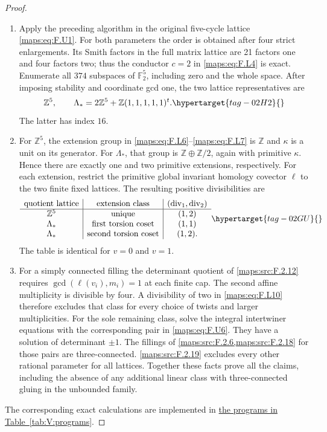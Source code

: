 \documentclass[11pt,a4paper]{article}
\numberwithin{equation}{section}
\theoremstyle{definition}
\begin{document}
\begin{proof}
\begin{enumerate}[label=\arabic*.]
\item Apply the preceding algorithm in the original five-cycle
lattice \eqref{maps:eq:F.U1}.  For both parameters the order is obtained
after four strict enlargements.  Its Smith factors in the
full matrix lattice are 21 factors one and four factors two;
thus the conductor $c=2$ in \eqref{maps:eq:F.L4} is exact.
Enumerate all $374$ subspaces of $\mathbb F_2^5$, including zero
and the whole space.
After imposing stability and coordinate gcd one, the two
lattice representatives are
\begin{equation}
 \mathbb Z^5,\qquad
 \Lambda_* =2\mathbb Z^5+\mathbb Z(1,1,1,1,1)^t.
 \hypertarget{tag-02H2}{}\label{maps:eq:F.L9}
\end{equation}
The latter has index $16$.

\item For $\mathbb Z^5$, the extension group in \eqref{maps:eq:F.L6}--\eqref{maps:eq:F.L7}
is $\mathbb Z$ and $\kappa$ is a unit on its generator.
For $\Lambda_*$, that group is
$\mathbb Z\oplus\mathbb Z/2$, again with primitive
$\kappa$.  Hence there are exactly one and two primitive
extensions, respectively.
For each extension, restrict the primitive global invariant homology
covector $\ell$ to the two finite fixed lattices. The resulting
positive divisibilities are
\begin{equation}
\begin{array}{c|c|c}
 \text{quotient lattice}&\text{extension class}&
       (\operatorname{div}_1,\operatorname{div}_2)\\\hline
 \mathbb Z^5&\text{unique}&(1,2)\\
 \Lambda_*&\text{first torsion coset}&(1,1)\\
 \Lambda_*&\text{second torsion coset}&(1,2).
\end{array}
 \hypertarget{tag-02GU}{}\label{maps:eq:F.L10}
\end{equation}
The table is identical for $v=0$ and $v=1$.

\item For a simply connected filling the determinant quotient
of \ref{maps:src:F.2.12} requires $\gcd(\ell(v_i),m_i)=1$ at each
finite cap.  The second affine multiplicity is divisible
by four.  A divisibility of two in \eqref{maps:eq:F.L10} therefore
excludes that class for every choice of twists and larger
multiplicities.
For the sole remaining class, solve the integral intertwiner
equations with the corresponding pair in \eqref{maps:eq:F.U6}.
They have a solution of determinant $\pm1$. The fillings of
\cref{maps:src:F.2.6,maps:src:F.2.18} for those pairs are three-connected.  \ref{maps:src:F.2.19} excludes every other
rational parameter for all lattices.
Together these facts prove all the claims, including the
absence of any additional linear class with three-connected gluing in the
unbounded family.

\end{enumerate}
The corresponding exact calculations are implemented in \hyperlink{prog:V:lattices}{the programs in Table~\ref*{tab:V:programs}}.
\end{proof}
\end{document}
